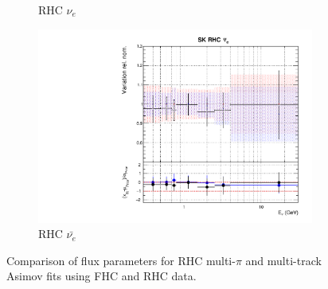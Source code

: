 \begin{figure}[t]
\begin{subfigure}{0.42\textwidth}
  \caption{\SK RHC $\nu_{e}$}
\end{subfigure}
\begin{subfigure}{0.42\textwidth}
  \centering
  \includegraphics[width=0.75\linewidth]{figs/rhcmpasmvflux15}
  \caption{\SK RHC $\bar{\nu_e}$}
\end{subfigure}
\caption{Comparison of \SK flux parameters for RHC multi-$\pi$ and multi-track Asimov fits using FHC and RHC data.}
\label{fig:rhcmpiasmvSK}
\end{figure}

